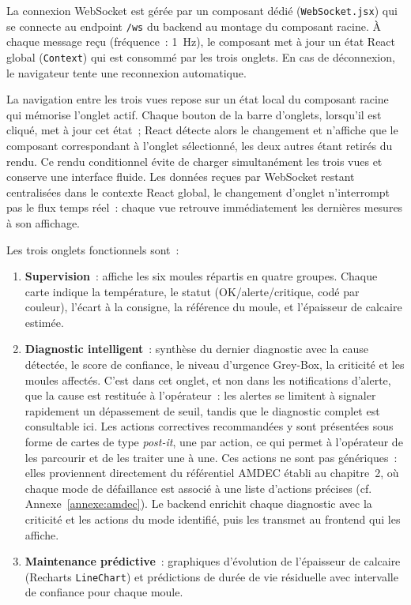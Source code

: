 La connexion WebSocket est gérée par un composant dédié (\texttt{WebSocket.jsx}) qui se connecte au endpoint \texttt{/ws} du backend au montage du composant racine. À chaque message reçu (fréquence~: 1~Hz), le composant met à jour un état React global (\texttt{Context}) qui est consommé par les trois onglets. En cas de déconnexion, le navigateur tente une reconnexion automatique.

La navigation entre les trois vues repose sur un état local du composant racine qui mémorise l'onglet actif. Chaque bouton de la barre d'onglets, lorsqu'il est cliqué, met à jour cet état~; React détecte alors le changement et n'affiche que le composant correspondant à l'onglet sélectionné, les deux autres étant retirés du rendu. Ce rendu conditionnel évite de charger simultanément les trois vues et conserve une interface fluide. Les données reçues par WebSocket restant centralisées dans le contexte React global, le changement d'onglet n'interrompt pas le flux temps réel~: chaque vue retrouve immédiatement les dernières mesures à son affichage.

Les trois onglets fonctionnels sont~:

\begin{enumerate}
  \item \textbf{Supervision}~: affiche les six moules répartis en quatre groupes. Chaque carte indique la température, le statut (OK/alerte/critique, codé par couleur), l'écart à la consigne, la référence du moule, et l'épaisseur de calcaire estimée.
  \item \textbf{Diagnostic intelligent}~: synthèse du dernier diagnostic avec la cause détectée, le score de confiance, le niveau d'urgence Grey-Box, la criticité et les moules affectés. C'est dans cet onglet, et non dans les notifications d'alerte, que la cause est restituée à l'opérateur~: les alertes se limitent à signaler rapidement un dépassement de seuil, tandis que le diagnostic complet est consultable ici. Les actions correctives recommandées y sont présentées sous forme de cartes de type \emph{post-it}, une par action, ce qui permet à l'opérateur de les parcourir et de les traiter une à une. Ces actions ne sont pas génériques~: elles proviennent directement du référentiel AMDEC établi au chapitre~2, où chaque mode de défaillance est associé à une liste d'actions précises (cf. Annexe~\ref{annexe:amdec}). Le backend enrichit chaque diagnostic avec la criticité et les actions du mode identifié, puis les transmet au frontend qui les affiche.
  \item \textbf{Maintenance prédictive}~: graphiques d'évolution de l'épaisseur de calcaire (Recharts \texttt{LineChart}) et prédictions de durée de vie résiduelle avec intervalle de confiance pour chaque moule.
\end{enumerate}

